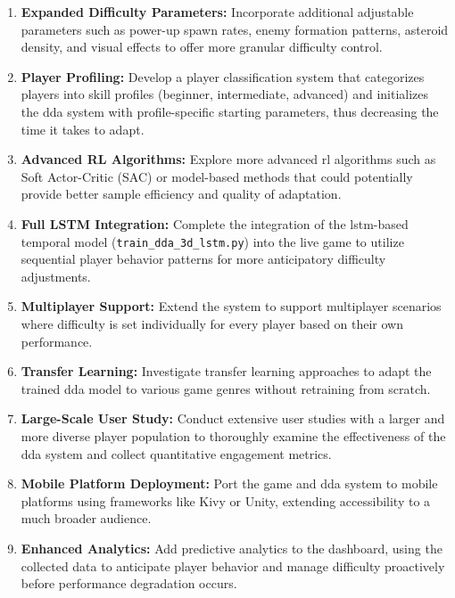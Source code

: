 \begin{enumerate}
	\item \textbf{Expanded Difficulty Parameters:} Incorporate additional adjustable parameters such as power-up spawn rates, enemy formation patterns, asteroid density, and visual effects to offer more granular difficulty control.
	
	\item \textbf{Player Profiling:} Develop a player classification system that categorizes players into skill profiles (beginner, intermediate, advanced) and initializes the \ac{dda} system with profile-specific starting parameters, thus decreasing the time it takes to adapt.
	
	\item \textbf{Advanced RL Algorithms:} Explore more advanced \ac{rl} algorithms such as Soft Actor-Critic (SAC) or model-based methods that could potentially provide better sample efficiency and quality of adaptation.
	
	\item \textbf{Full LSTM Integration:} Complete the integration of the \ac{lstm}-based temporal model (\texttt{train\_dda\_3d\_lstm.py}) into the live game to utilize sequential player behavior patterns for more anticipatory difficulty adjustments.
	
	\item \textbf{Multiplayer Support:} Extend the system to support multiplayer scenarios where difficulty is set individually for every player based on their own performance.
	
	\item \textbf{Transfer Learning:} Investigate transfer learning approaches to adapt the trained \ac{dda} model to various game genres without retraining from scratch.
	
	\item \textbf{Large-Scale User Study:} Conduct extensive user studies with a larger and more diverse player population to thoroughly examine the effectiveness of the \ac{dda} system and collect quantitative engagement metrics.
	
	\item \textbf{Mobile Platform Deployment:} Port the game and \ac{dda} system to mobile platforms using frameworks like Kivy or Unity, extending accessibility to a much broader audience.
	
	\item \textbf{Enhanced Analytics:} Add predictive analytics to the dashboard, using the collected data to anticipate player behavior and manage difficulty proactively before performance degradation occurs.
\end{enumerate}
